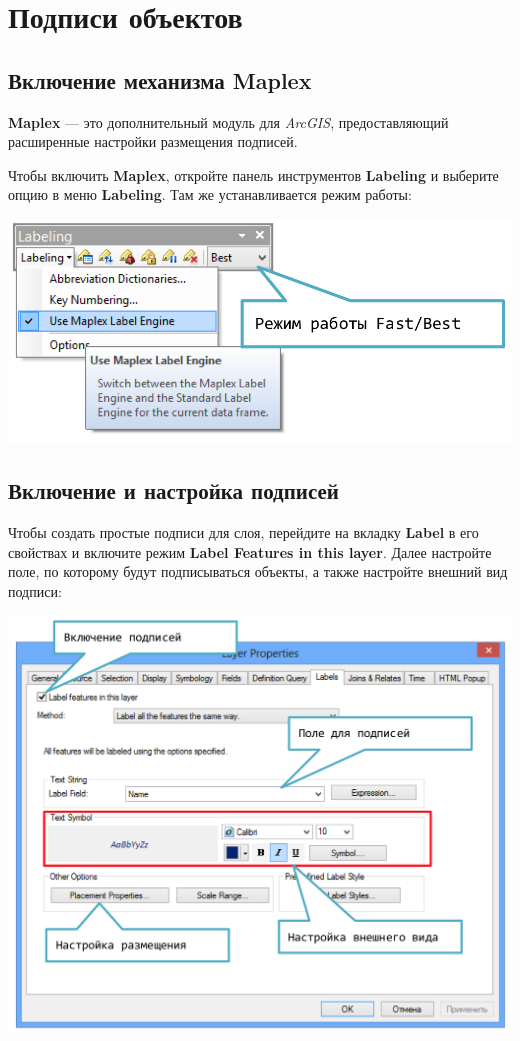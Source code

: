 \documentclass[12pt,]{book}
\begin{document}
\hypertarget{manual-labels}{%
\chapter{Подписи объектов}\label{manual-labels}}

\hypertarget{maplex}{%
\section{Включение механизма Maplex}\label{maplex}}

\textbf{Maplex} --- это дополнительный модуль для \emph{ArcGIS}, предоставляющий расширенные настройки размещения подписей.

Чтобы включить \textbf{Maplex}, откройте панель инструментов \textbf{Labeling} и выберите опцию в меню \textbf{Labeling}. Там же устанавливается режим работы:

\includegraphics{images/Appendix/image39.png}

\hypertarget{section-24}{%
\section{Включение и настройка подписей}\label{section-24}}

Чтобы создать простые подписи для слоя, перейдите на вкладку \textbf{Label} в его свойствах и включите режим \textbf{Label Features in this layer}. Далее настройте поле, по которому будут подписываться объекты, а также настройте внешний вид подписи:

\includegraphics{images/Appendix/image40.png}
\end{document}
